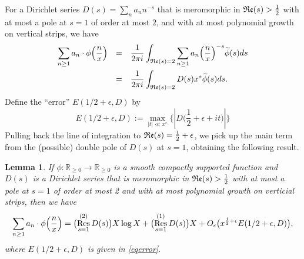 \documentclass[10pt]{article}
\theoremstyle{plain}
\newtheorem{lemma}[thm]{Lemma}
\theoremstyle{definition}
\theoremstyle{remark}
\DeclareMathOperator{\Res}{Res}
\renewcommand{\Re}{\frak{Re}}
\def\bR{{\mathbb R}}
\begin{document}
For a Dirichlet series $D(s) = \sum_n a_nn^{-s}$ that is meromorphic
in $\Re(s)>\frac12$ with at most a pole at $s=1$ of order at most $2$,
and with at most polynomial growth on vertical strips, we have
\begin{equation*}
\begin{array}{rcl}
\displaystyle\sum_{n\geq 1}a_{n}\cdot\phi\Bigl(\frac{n}{x}\Bigr)&=&
\displaystyle\frac{1}{2\pi i}\int_{\Re(s)=2}
\sum_{n\geq 1}a_{n}\Bigl(\frac{n}{x}\Bigr)^{-s}
\widetilde{\phi}(s)ds
\\[.2in]&=&
\displaystyle\frac{1}{2\pi i}\int_{\Re(s)=2}
D(s)x^s\widetilde{\phi}(s)ds.
\end{array}
\end{equation*}
Define the ``error'' $E(1/2+\epsilon,D)$ by
\begin{equation}\label{eqerror}
E(1/2+\epsilon,D):=\max_{|t|\ll x^\epsilon}
\{|D\bigl({\textstyle\frac12}+\epsilon+it\bigr)|\}
\end{equation}
Pulling back the line of integration to $\Re(s)=\frac12+\epsilon$, we
pick up the main term from the (possible) double pole of $D(s)$ at
$s=1$, obtaining the following result.
\begin{lemma}\label{lemMellin}
If $\phi: \bR_{\geq 0} \rightarrow \bR_{\geq 0}$ is a smooth compactly supported function and $D(s)$ is a Dirichlet series that is meromorphic in $\Re(s) > \frac{1}{2}$ with at most a pole at $s = 1$ of order at most 2 and with at most polynomial growth on verticial strips, then we have
\begin{equation*}
\sum_{n\geq 1}a_{n}\cdot\phi\Bigl(\frac{n}{x}\Bigr)=
\bigl(\Res^{(2)}_{s=1}D(s)\bigr)X\log X+\bigl(\Res^{(1)}_{s=1}D(s)\bigr)X+
O_\epsilon\bigl(x^{\frac12+\epsilon}
E(1/2+\epsilon,D)\bigr),
\end{equation*}
where $E(1/2+\epsilon, D)$ is given in \eqref{eqerror}.
\end{lemma}
\end{document}
